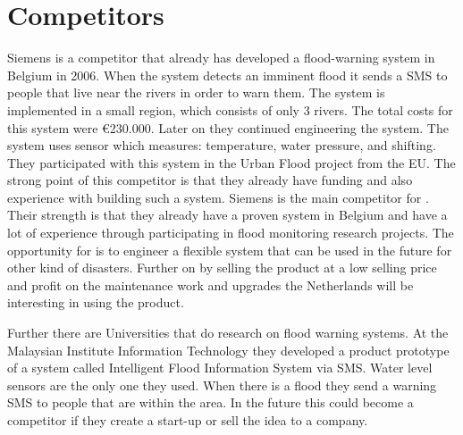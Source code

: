 \section{Competitors}
Siemens is a competitor that already has developed a flood-warning system in Belgium in 2006. When the system detects an imminent flood it sends a SMS to people that live near the rivers in order to warn them. The system is implemented in a small region, which consists of only 3 rivers. The total costs for this system were \euro{}230.000. Later on they continued engineering the system. The system uses sensor which measures: temperature, water pressure, and shifting. They participated with this system in the Urban Flood project from the EU. The strong point of this competitor is that they already have funding and also experience with building such a system. Siemens is the main competitor for \CompanyName{}. Their strength is that they already have a proven system in Belgium and have a lot of experience through participating in flood monitoring research projects. The opportunity for \CompanyName{} is to engineer a flexible system that can be used in the future for other kind of disasters. Further on by selling the product at a low selling price and profit on the maintenance work and upgrades the Netherlands will be interesting in using the product.

Further there are Universities that do research on flood warning systems. At the Malaysian Institute Information Technology they developed a product prototype of a system called Intelligent Flood Information System via SMS. Water level sensors are the only one they used. When there is a flood they send a warning SMS to people that are within the area. In the future this could become a competitor if they create a start-up or sell the idea to a company.  



